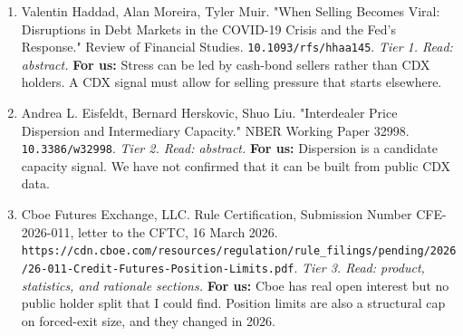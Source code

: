 \begin{enumerate}[leftmargin=*,itemsep=3pt]
\item Valentin Haddad, Alan Moreira, Tyler Muir. "When Selling Becomes Viral: Disruptions in Debt Markets in the COVID-19 Crisis and the Fed's Response." Review of Financial Studies. \nolinkurl{10.1093/rfs/hhaa145}. \emph{Tier 1. Read: abstract.} \textbf{For us:} Stress can be led by cash-bond sellers rather than CDX holders. A CDX signal must allow for selling pressure that starts elsewhere.
\item Andrea L. Eisfeldt, Bernard Herskovic, Shuo Liu. "Interdealer Price Dispersion and Intermediary Capacity." NBER Working Paper 32998. \nolinkurl{10.3386/w32998}. \emph{Tier 2. Read: abstract.} \textbf{For us:} Dispersion is a candidate capacity signal. We have not confirmed that it can be built from public CDX data.
\item Cboe Futures Exchange, LLC. Rule Certification, Submission Number CFE-2026-011, letter to the CFTC, 16 March 2026. \nolinkurl{https://cdn.cboe.com/resources/regulation/rule\_filings/pending/2026/26-011-Credit-Futures-Position-Limits.pdf}. \emph{Tier 3. Read: product, statistics, and rationale sections.} \textbf{For us:} Cboe has real open interest but no public holder split that I could find. Position limits are also a structural cap on forced-exit size, and they changed in 2026.
\end{enumerate}
